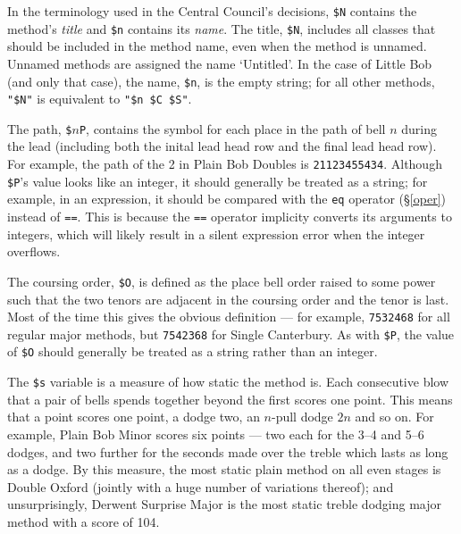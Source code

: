 \documentclass[a4paper,11pt,oneside]{book}
\makeatletter
\newcommand{\fspec}[1]{\index{#1@{\hspace*{-\fspecwidth}\texttt{\$#1}}}}
\newcommand{\sref}[1]{\hyperref[#1]{\S\ref{#1}}}
\makeatother
\begin{document}
In the terminology used in the Central Council's 
decisions, 
\verb+$N+ contains the method's \textit{title} 
and \verb+$n+ contains its \textit{name}.
The title, \verb+$N+\fspec{N}, includes all classes that should be 
included in the method name, even when the method is unnamed.  Unnamed methods
are assigned the name `Untitled'.  In the case of Little Bob (and only that 
case), the name, \verb+$n+, is the empty string; for all other methods,
\verb+"$N"+ is equivalent to \verb+"$n $C $S"+.

The path, \verb+$+$n$\verb+P+,\fspec{P} contains the symbol for
each place in the path of bell $n$ during the lead (including both the inital
lead head row and the final lead head row).  For example, the path of the 2
in Plain Bob Doubles is \verb+21123455434+.  Although \verb+$P+'s value
looks like an integer, it should generally be treated as a string; for example,
in an expression, it should be compared with the \verb+eq+ operator 
(\sref{oper}) instead of \verb+==+.  This is because the \verb+==+ operator
implicity converts its arguments to integers, which will likely result in
a silent expression error when the integer overflows.

The coursing order, \verb+$O+\fspec{O}, is defined as
the place bell order raised to some power such that 
the two tenors are adjacent in the coursing order and the tenor is last.
Most of the time this gives the obvious definition --- for example, 
\verb+7532468+ for all regular major methods, but \verb+7542368+ for 
Single Canterbury.  As with \verb+$P+, the value of \verb+$O+ should generally
be treated as a string rather than an integer.

The \verb+$s+\fspec{s} variable is a measure of how static the method is.
Each consecutive blow that a pair of bells spends together beyond the first 
scores one point.  This means that a point scores one point, a dodge two, an $n$-pull dodge $2n$ and so on. For example, Plain Bob Minor scores six points 
--- two each for the 3--4 and 5--6 dodges, and two further for the seconds made
over the treble which lasts as long as a dodge.  By this measure, the most 
static plain method on all even stages is Double Oxford (jointly with 
a huge number of variations thereof); and unsurprisingly, Derwent Surprise
Major is the most static treble dodging major method with a score of 104.  
\end{document}
